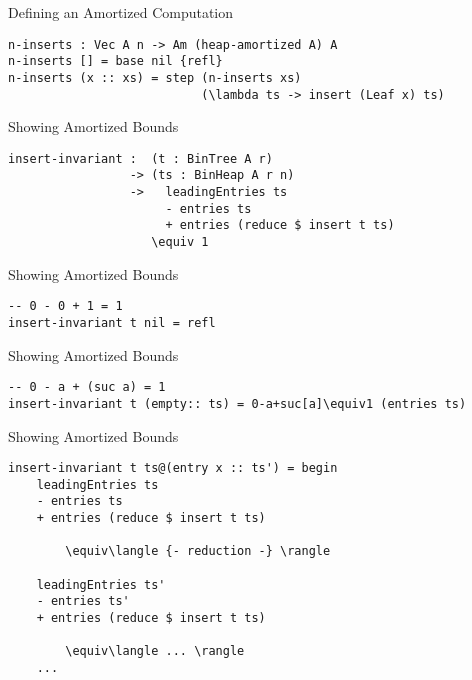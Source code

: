 \documentclass[11pt]{beamer}
\begin{document}
    \begin{frame}[fragile]{Defining an Amortized Computation}
        \begin{lstlisting}[emph={n,inserts}]
n-inserts : Vec A n -> Am (heap-amortized A) A
n-inserts [] = base nil {refl}
n-inserts (x :: xs) = step (n-inserts xs)
                           (\lambda ts -> insert (Leaf x) ts)
        \end{lstlisting}
    \end{frame}

    \begin{frame}[fragile]{Showing Amortized Bounds}
        \begin{lstlisting}[emph={insert,invariant}]
insert-invariant :  (t : BinTree A r)
                 -> (ts : BinHeap A r n)
                 ->   leadingEntries ts
                      - entries ts
                      + entries (reduce $ insert t ts)
                    \equiv 1
        \end{lstlisting}
    \end{frame}

    \begin{frame}[fragile]{Showing Amortized Bounds}
        \begin{lstlisting}[emph={insert,invariant}]
-- 0 - 0 + 1 = 1
insert-invariant t nil = refl
        \end{lstlisting}
    \end{frame}

    \begin{frame}[fragile]{Showing Amortized Bounds}
        \begin{lstlisting}[emph={insert,invariant}]
-- 0 - a + (suc a) = 1
insert-invariant t (empty:: ts) = 0-a+suc[a]\equiv1 (entries ts)
        \end{lstlisting}
    \end{frame}

    \begin{frame}[fragile]{Showing Amortized Bounds}
        \begin{lstlisting}[emph={insert,invariant}]
insert-invariant t ts@(entry x :: ts') = begin
    leadingEntries ts
    - entries ts
    + entries (reduce $ insert t ts)

        \equiv\langle {- reduction -} \rangle

    leadingEntries ts'
    - entries ts'
    + entries (reduce $ insert t ts)

        \equiv\langle ... \rangle
    ...
        \end{lstlisting}
    \end{frame}
\end{document}
